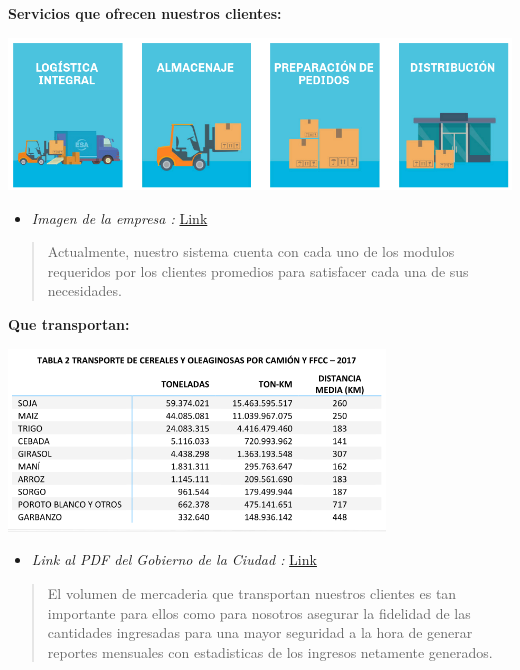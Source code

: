 \documentclass[
10pt, %
a4paper, %
oneside, %
headinclude,footinclude, %
BCOR5mm, %
]{scrartcl}
\begin{document}
 \textbf{Servicios que ofrecen nuestros clientes:}
 \begin{flushleft}
     \includegraphics[width=14cm, keepaspectratio]{images/services.png}
 \end{flushleft}
  \begin{itemize}
    \item \textit{Imagen de la empresa :}
      \href{http://www.esalogistica.com.ar/index.html#quehacemos} {Link}
  \end{itemize}
  \begin{quotation}
    Actualmente, nuestro sistema cuenta con cada uno de los modulos requeridos
    por los clientes promedios para satisfacer cada una de sus necesidades.
  \end{quotation}
 \textbf{Que transportan:}
 \begin{flushleft}
     \includegraphics[width=10cm, keepaspectratio]{images/loads.png}
 \end{flushleft}
  \begin{itemize}
    \item \textit{Link al PDF del Gobierno de la Ciudad :}
      \href{https://www.argentina.gob.ar/sites/default/files/transporte_terrestre_de_cereales_y_oleaginosas_2017_v1.pdf} {Link}
  \end{itemize}
  \begin{quotation}
    El volumen de mercaderia que transportan nuestros clientes es tan
    importante para ellos como para nosotros asegurar la fidelidad de las
    cantidades ingresadas para una mayor seguridad a la hora de generar
    reportes mensuales con estadisticas de los ingresos netamente generados.
  \end{quotation}
\end{document}
